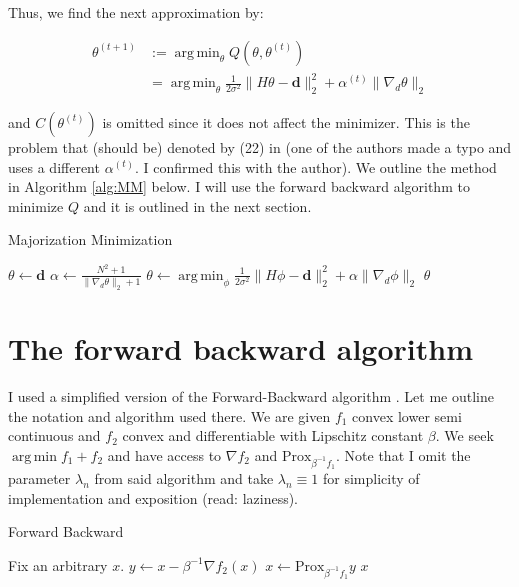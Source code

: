 \documentclass[paper=a4, fontsize=11pt]{scrartcl} %
\DeclareMathOperator*{\argmin}{arg\,min}
\numberwithin{equation}{section} %
\numberwithin{figure}{section} %
\numberwithin{table}{section} %
\newcommand{\data}{\mathbf{d}}
\newcommand{\param}{\theta}
\newcommand{\paramm}{\phi}
\newcommand{\prox}{\text{Prox}}
\newcommand{\grad}{\nabla_{d} }
\begin{document}
Thus, we find the next approximation by:

\begin{align*}
  \param^{(t+1)} &:= \argmin_{\param} Q(\param, \param^{(t)}) \\
  &= \argmin_{\param}  \frac{1}{2\sigma^2} \|H\param - \data \|_2^2 + \alpha^{(t)} \|\grad \param\|_2
\end{align*}

and $C(\param^{(t)})$ is omitted since it does not affect the
minimizer. This is the problem that (should be) denoted by (22) in
\cite{green2015bayesian} (one of the authors made a typo and uses a
different $\alpha^{(t)}$. I confirmed this with the author). We
outline the method in Algorithm \ref{alg:MM} below. I will use the
forward backward algorithm \cite{combettes2011splitting} to minimize
$Q$ and it is outlined in the next section.

\begin{algorithm}
  \caption{Majorization Minimization}\label{alg:MM}
  \begin{algorithmic}
    \Procedure{MM}{\data}
    \State $\param \gets \data$
    \State $\alpha \gets \frac{N^2 + 1}{\|\grad \param\|_2 + 1}$ 
    \State $\param \gets \argmin_{\paramm} \frac{1}{2\sigma^2} \|H\paramm - \data \|_2^2 + \alpha \|\grad \paramm\|_2$
    \EndFor
    \State \Return $\param$
    \EndProcedure
  \end{algorithmic}
\end{algorithm}


\section{The forward backward algorithm}
I used a simplified version of the Forward-Backward algorithm
\cite[algorithm 3.4]{combettes2011proximal}. Let me outline the
notation and algorithm used there. We are given $f_1$ convex lower
semi continuous and $f_2$ convex and differentiable with Lipschitz
constant $\beta$. We seek $\argmin f_1 + f_2$ and have access to
$\nabla f_2$ and $\prox_{\beta^{-1} f_1}$. Note that I omit the
parameter $\lambda_n$ from said algorithm and take $\lambda_n \equiv 1$
for simplicity of implementation and exposition (read: laziness).

\begin{algorithm}
  \caption{Forward Backward}\label{alg:forward backward}
  \begin{algorithmic}
    \State Fix an arbitrary $x$.
    \State $y \gets x - \beta^{-1}\nabla f_2(x)$
    \State $x \gets \prox_{\beta^{-1}f_1} y$
    \EndFor
    \State \Return $x$
  \end{algorithmic}
\end{algorithm}
\end{document}
